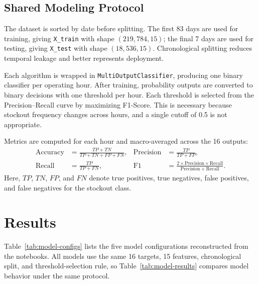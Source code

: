 \documentclass{llncs}
\begin{document}
\subsection{Shared Modeling Protocol}
The dataset is sorted by date before splitting. The first 83 days are used for training, giving \texttt{X\_train} with shape $(219{,}784,15)$; the final 7 days are used for testing, giving \texttt{X\_test} with shape $(18{,}536,15)$. Chronological splitting reduces temporal leakage and better represents deployment.

Each algorithm is wrapped in \texttt{MultiOutputClassifier}, producing one binary classifier per operating hour. After training, probability outputs are converted to binary decisions with one threshold per hour. Each threshold is selected from the Precision--Recall curve by maximizing F1-Score. This is necessary because stockout frequency changes across hours, and a single cutoff of 0.5 is not appropriate.

Metrics are computed for each hour and macro-averaged across the 16 outputs:
\begin{align}
\mathrm{Accuracy} &= \frac{TP+TN}{TP+TN+FP+FN}, &
\mathrm{Precision} &= \frac{TP}{TP+FP}, \\
\mathrm{Recall} &= \frac{TP}{TP+FN}, &
\mathrm{F1} &= \frac{2\times\mathrm{Precision}\times\mathrm{Recall}}{\mathrm{Precision}+\mathrm{Recall}}.
\end{align}
Here, $TP$, $TN$, $FP$, and $FN$ denote true positives, true negatives, false positives, and false negatives for the stockout class.

\section{Results}
Table~\ref{tab:model-configs} lists the five model configurations reconstructed from the notebooks. All models use the same 16 targets, 15 features, chronological split, and threshold-selection rule, so Table~\ref{tab:model-results} compares model behavior under the same protocol.
\end{document}
